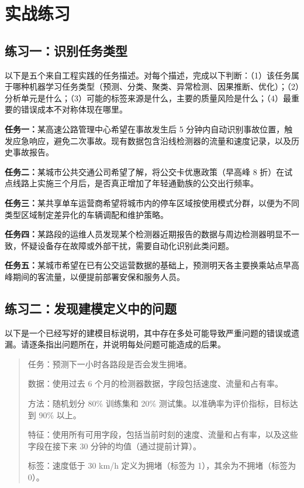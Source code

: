 \section{实战练习}

\subsection*{练习一：识别任务类型}

以下是五个来自工程实践的任务描述。对每个描述，完成以下判断：（1）该任务属于哪种机器学习任务类型（预测、分类、聚类、异常检测、因果推断、优化）；（2）分析单元是什么；（3）可能的标签来源是什么，主要的质量风险是什么；（4）最重要的错误成本不对称体现在哪里。

\smallskip
\textbf{任务一：}某高速公路管理中心希望在事故发生后 5 分钟内自动识别事故位置，触发应急响应，避免二次事故。现有数据包含沿线检测器的流量和速度记录，以及历史事故报告。

\smallskip
\textbf{任务二：}某城市公共交通公司希望了解，将公交卡优惠政策（早高峰 8 折）在试点线路上实施三个月后，是否真正增加了年轻通勤族的公交出行频率。

\smallskip
\textbf{任务三：}某共享单车运营商希望将城市内的停车区域按使用模式分群，以便为不同类型区域制定差异化的车辆调配和维护策略。

\smallskip
\textbf{任务四：}某路段的运维人员发现某个检测器近期报告的数据与周边检测器明显不一致，怀疑设备存在故障或外部干扰，需要自动化识别此类问题。

\smallskip
\textbf{任务五：}某城市希望在已有公交运营数据的基础上，预测明天各主要换乘站点早高峰期间的客流量，以便提前部署安保和服务人员。

\subsection*{练习二：发现建模定义中的问题}

以下是一个已经写好的建模目标说明，其中存在多处可能导致严重问题的错误或遗漏。请逐条指出问题所在，并说明每处问题可能造成的后果。

\begin{quote}
任务：预测下一小时各路段是否会发生拥堵。

数据：使用过去 6 个月的检测器数据，字段包括速度、流量和占有率。

方法：随机划分 80\% 训练集和 20\% 测试集。以准确率为评价指标，目标达到 90\% 以上。

特征：使用所有可用字段，包括当前时刻的速度、流量和占有率，以及这些字段在接下来 30 分钟的均值（通过提前计算）。

标签：速度低于 30 km/h 定义为拥堵（标签为 1），其余为不拥堵（标签为 0）。
\end{quote}

